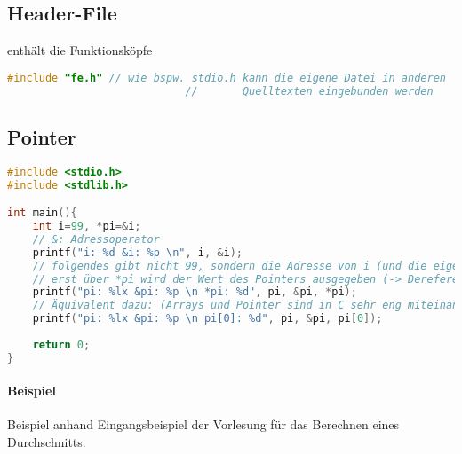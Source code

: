 \subsection{Header-File}
enthält die Funktionsköpfe
\begin{lstlisting}[language=C]
#include "fe.h" // wie bspw. stdio.h kann die eigene Datei in anderen
							//		 Quelltexten eingebunden werden
\end{lstlisting}

\subsection{Pointer}
\begin{lstlisting}[language=C]
#include <stdio.h>
#include <stdlib.h>

int main(){
	int i=99, *pi=&i;
	// &: Adressoperator
	printf("i: %d &i: %p \n", i, &i);
	// folgendes gibt nicht 99, sondern die Adresse von i (und die eigene) aus.
	// erst über *pi wird der Wert des Pointers ausgegeben (-> Dereferenzieren)
	printf("pi: %lx &pi: %p \n *pi: %d", pi, &pi, *pi);
	// Äquivalent dazu: (Arrays und Pointer sind in C sehr eng miteinander verwandt)
	printf("pi: %lx &pi: %p \n pi[0]: %d", pi, &pi, pi[0]);
	
	return 0;
}
\end{lstlisting}

\paragraph{Beispiel}

Beispiel anhand Eingangsbeispiel der Vorlesung für das Berechnen eines Durchschnitts.

